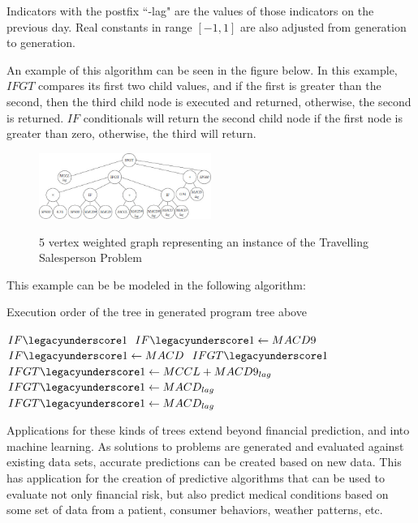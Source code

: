 \documentclass{article}
\renewcommand{\_}{\ifincsname_\else\legacyunderscore\fi}
\begin{document}
Indicators with the postfix ``-lag" are the values of those indicators on the previous day. Real constants in range $[-1, 1]$ are also adjusted from generation to generation.

An example of this algorithm can be seen in the figure below. In this example, $IFGT$ compares its first two child values, and if the first is greater than the second, then the third child node is executed and returned, otherwise, the second is returned. $IF$ conditionals will return the second child node if the first node is greater than zero, otherwise, the third will return.
\begin{figure}[!h]
    \centering
    \includegraphics[width=0.5\textwidth,keepaspectratio]{gen_alg_tree.jpg}
    \label{fig:space_partition}
    \caption{5 vertex weighted graph representing an instance of the Travelling Salesperson Problem}
\end{figure}

This example can be be modeled in the following algorithm:

\begin{algorithm}[!h]
    \DontPrintSemicolon
    \caption{Execution order of the tree in generated program tree above}
    \label{alg:sp500}

    $IF\_1$\;
    {
        $IF\_1 \gets MACD9$\;
    }
    \Else
    {
        $IF\_1 \gets MACD$\;
    }
    $IFGT\_1$\;
    \If{$SP500*0.74 > IF\_1$}
    {
        $IFGT\_1 \gets MCCL + MACD9_{lag}$\;
    }
    \Else
    {
        {
            $IFGT\_1 \gets MACD_{lag}$\;
        }
        \Else
        {
            $IFGT\_1 \gets MACD_{lag}$\;
        }
    }
    \If{$MCCL_{lag} > IFGT\_1$}
    {
        \;
    }
    \Else
    {
        \;
    }
\end{algorithm}
\newpage

Applications for these kinds of trees extend beyond financial prediction, and into machine learning. As solutions to problems are generated and evaluated against existing data sets, accurate predictions can be created based on new data. This has application for the creation of predictive algorithms that can be used to evaluate not only financial risk, but also predict medical conditions based on some set of data from a patient, consumer behaviors, weather patterns, etc.  
\end{document}
